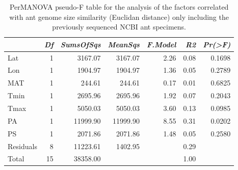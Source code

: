 \begin{table}[ht]
\centering
\begin{tabular}{lrrrrrr}
  \hline
 & {\emph{Df}} & {\emph{SumsOfSqs}} & {\emph{MeanSqs}} & {\emph{F.Model}} & {\emph{R2}} & {\emph{Pr(>F)}} \\ 
  \hline
Lat & 1 & 3167.07 & 3167.07 & 2.26 & 0.08 & 0.1698 \\ 
  Lon & 1 & 1904.97 & 1904.97 & 1.36 & 0.05 & 0.2789 \\ 
  MAT & 1 & 244.61 & 244.61 & 0.17 & 0.01 & 0.6825 \\ 
  Tmin & 1 & 2695.96 & 2695.96 & 1.92 & 0.07 & 0.2043 \\ 
  Tmax & 1 & 5050.03 & 5050.03 & 3.60 & 0.13 & 0.0985 \\ 
  PA & 1 & 11999.90 & 11999.90 & 8.55 & 0.31 & 0.0202 \\ 
  PS & 1 & 2071.86 & 2071.86 & 1.48 & 0.05 & 0.2580 \\ 
  Residuals & 8 & 11223.61 & 1402.95 &  & 0.29 &  \\ 
  Total & 15 & 38358.00 &  &  & 1.00 &  \\ 
   \hline
\end{tabular}
\caption{PerMANOVA pseudo-F table for the analysis of the factors 
correlated with ant genome size similarity (Euclidan distance) only including the 
previously sequenced NCBI ant specimens.} 
\label{tab:perm_size_napg}
\end{table}
